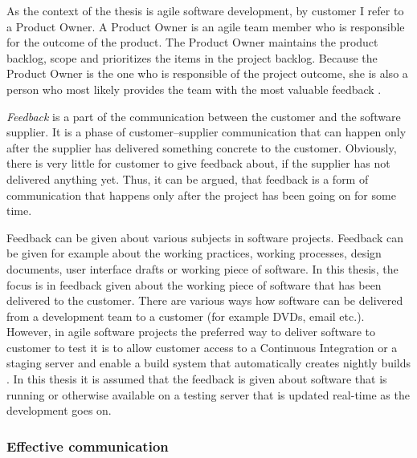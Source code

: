 \documentclass[english,12pt,a4paper,pdftex]{article}
\begin{document}
As the context of the thesis is agile software development, by customer I refer to a Product Owner. A Product Owner is an agile team member who is responsible for the outcome of the product. The Product Owner maintains the product backlog, scope and prioritizes the items in the project backlog. Because the Product Owner is the one who is responsible of the project outcome, she is also a person who most likely provides the team with the most valuable feedback \citep{pichler2010}.

\textit{Feedback} is a part of the communication between the customer and the software supplier. It is a phase of customer--supplier communication that can happen only after the supplier has delivered something concrete to the customer. Obviously, there is very little for customer to give feedback about, if the supplier has not delivered anything yet. Thus, it can be argued, that feedback is a form of communication that happens only after the project has been going on for some time.

Feedback can be given about various subjects in software projects. Feedback can be given for example about the working practices, working processes, design documents, user interface drafts or working piece of software. In this thesis, the focus is in feedback given about the working piece of software that has been delivered to the customer. There are various ways how software can be delivered from a development team to a customer (for example DVDs, email etc.). However, in agile software projects the preferred way to deliver software to customer to test it is to allow customer access to a Continuous Integration or a staging server and enable a build system that automatically creates nightly builds \citep{shore2007} \citep{beck2004}. In this thesis it is assumed that the feedback is given about software that is running or otherwise available on a testing server that is updated real-time as the development goes on.

\subsubsection{Effective communication}

\end{document}
